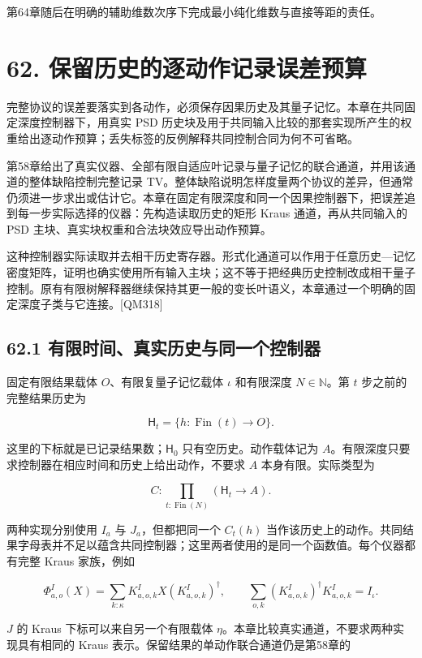 \documentclass[
  11pt,
  oneside]{book}
\begin{document}
第64章随后在明确的辅助维数次序下完成最小纯化维数与直接等距的责任。

\chapter{62. 保留历史的逐动作记录误差预算}\label{ch-62}\hypertarget{ch-62}{}

完整协议的误差要落实到各动作，必须保存因果历史及其量子记忆。本章在共同固定深度控制器下，用真实
PSD
历史块及用于共同输入比较的那套实现所产生的权重给出逐动作预算；丢失标签的反例解释共同控制合同为何不可省略。

第58章给出了真实仪器、全部有限自适应叶记录与量子记忆的联合通道，并用该通道的整体缺陷控制完整记录
TV。整体缺陷说明怎样度量两个协议的差异，但通常仍须进一步求出或估计它。本章在固定有限深度和同一个因果控制器下，把误差追到每一步实际选择的仪器：先构造读取历史的矩形
Kraus 通道，再从共同输入的 PSD
主块、真实块权重和合法块效应导出动作预算。

这种控制器实际读取并去相干历史寄存器。形式化通道可以作用于任意历史---记忆密度矩阵，证明也确实使用所有输入主块；这不等于把经典历史控制改成相干量子控制。原有有限树解释器继续保持其更一般的变长叶语义，本章通过一个明确的固定深度子类与它连接。{[}QM318{]}

\section{62.1 有限时间、真实历史与同一个控制器}

固定有限结果载体 \(O\)、有限复量子记忆载体 \(\iota\) 和有限深度
\(N\in\mathbb N\)。第 \(t\) 步之前的完整结果历史为

\[
\mathsf H_t=\{h:\operatorname{Fin}(t)\to O\}.
\]

这里的下标就是已记录结果数；\(\mathsf H_0\) 只有空历史。动作载体记为
\(A\)。有限深度只要求控制器在相应时间和历史上给出动作，不要求 \(A\)
本身有限。实际类型为

\[
C:\prod_{t:\operatorname{Fin}(N)}(\mathsf H_t\to A).
\]

两种实现分别使用 \(I_a\) 与 \(J_a\)，但都把同一个 \(C_t(h)\)
当作该历史上的动作。共同结果字母表并不足以蕴含共同控制器；这里两者使用的是同一个函数值。每个仪器都有完整
Kraus 家族，例如

\[
\Phi^I_{a,o}(X)=\sum_{k:\kappa}K^I_{a,o,k}X(K^I_{a,o,k})^\dagger,
\qquad
\sum_{o,k}(K^I_{a,o,k})^\dagger K^I_{a,o,k}=I_\iota.
\]

\(J\) 的 Kraus 下标可以来自另一个有限载体
\(\eta\)。本章比较真实通道，不要求两种实现具有相同的 Kraus
表示。保留结果的单动作联合通道仍是第58章的
\end{document}
